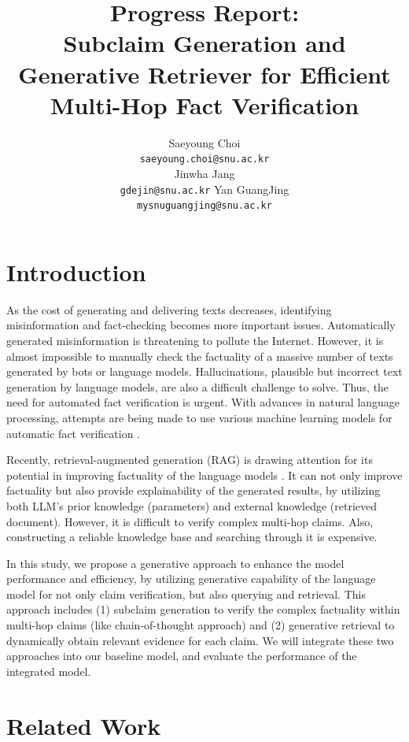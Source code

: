 \documentclass{article}
\title{Progress Report: \\ Subclaim Generation and Generative Retriever for Efficient Multi-Hop Fact Verification}
\author{%
  Saeyoung Choi \\
  \texttt{saeyoung.choi@snu.ac.kr} \\
  \And
  Jinwha Jang \\
  \texttt{gdejin@snu.ac.kr}
  \And
  Yan GuangJing \\
  \texttt{mysnuguangjing@snu.ac.kr} \\
}
\begin{document}
\maketitle

\section{Introduction}
As the cost of generating and delivering texts decreases, identifying misinformation and fact-checking becomes more important issues. Automatically generated misinformation is threatening to pollute the Internet. However, it is almost impossible to manually check the factuality of a massive number of texts generated by bots or language models. Hallucinations, plausible but incorrect text generation by language models, are also a difficult challenge to solve. Thus, the need for automated fact verification is urgent. With advances in natural language processing, attempts are being made to use various machine learning models for automatic fact verification \cite{chopra2017towards,zhong2019reasoning,nie2019combining}.\par
Recently, retrieval-augmented generation (RAG) \cite{lewis2020retrieval,izacard2020leveraging} is drawing attention for its potential in improving factuality of the language models \cite{shuster2021retrieval,ren2023investigating}. It can not only improve factuality but also provide explainability of the generated results, by utilizing both LLM's prior knowledge (parameters) and external knowledge (retrieved document). However, it is difficult to verify complex multi-hop claims. Also, constructing a reliable knowledge base and searching through it is expensive.\par
In this study, we propose a generative approach to enhance the model performance and efficiency, by utilizing generative capability of the language model for not only claim verification, but also querying and retrieval. This approach includes (1) subclaim generation to verify the complex factuality within multi-hop claims (like chain-of-thought approach) and (2) generative retrieval to dynamically obtain relevant evidence for each claim. We will integrate these two approaches into our baseline model, and evaluate the performance of the integrated model.


\section{Related Work}
\end{document}
